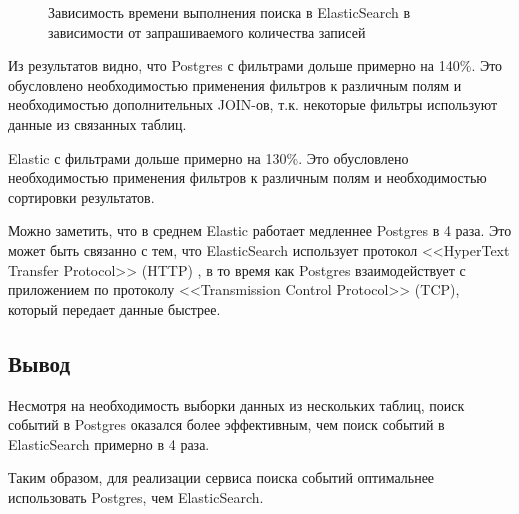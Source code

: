 \begin{figure}[h]
	\begin{center}
	\end{center}
	\caption{Зависимость времени выполнения поиска в ElasticSearch в зависимости от запрашиваемого количества записей}
	\label{fig:time-es}
\end{figure}

\clearpage

Из результатов видно, что Postgres с фильтрами дольше примерно на 140\%. Это обусловлено необходимостью применения фильтров к различным полям и необходимостью дополнительных JOIN-ов, т.к. некоторые фильтры используют данные из связанных таблиц.

Elastic с фильтрами дольше примерно на 130\%. Это обусловлено необходимостью применения фильтров к различным полям и необходимостью сортировки результатов.

Можно заметить, что в среднем Elastic работает медленнее Postgres в 4 раза. Это может быть связанно с тем, что ElasticSearch использует протокол <<HyperText Transfer Protocol>> (HTTP) \cite{http}, в то время как Postgres взаимодействует с приложением по протоколу <<Transmission Control Protocol>> (TCP), который передает данные быстрее. 

\subsection*{Вывод}
Несмотря на необходимость выборки данных из нескольких таблиц, поиск событий в Postgres оказался более эффективным, чем поиск событий в \linebreak ElasticSearch примерно в 4 раза. 

Таким образом, для реализации сервиса поиска событий оптимальнее использовать Postgres, чем ElasticSearch.







